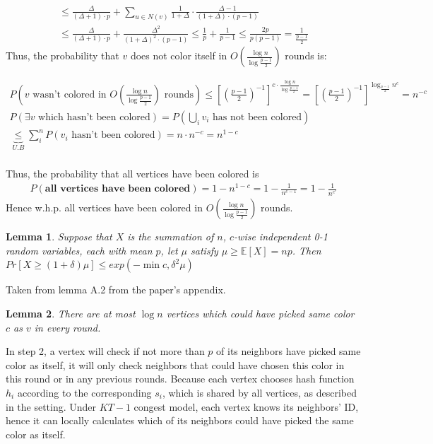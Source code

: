 \documentclass[11pt]{article}
\newtheorem{lemma}{Lemma}
\begin{document}
\begin{gather*}
\le \frac{\Delta}{(\Delta + 1) \cdot p} + \sum_{u \in N(v)}{\frac{1}{1 + \Delta} \cdot \frac{\Delta-1}{(1+ \Delta) \cdot (p-1)} } \\
\le \frac{\Delta}{(\Delta + 1) \cdot p} + \frac{\Delta^2}{(1 + \Delta)^2 \cdot (p-1)}
\le \frac{1}{p} + \frac{1}{p-1} \le \frac{2p}{p(p-1)} = \frac{1}{\frac{p-1}{2}}
\end{gather*}
Thus, the probability that $v$ does not color itself in $O(\frac{\log{n}}{\log{\frac{p-1}{2}}})$ rounds is:

\begin{gather*}
P(v \text{ wasn't colored in $O(\frac{\log{n}}{\log{\frac{p-1}{2}}})$ rounds})
\le [(\frac{p-1}{2})^{-1}]^{c \cdot \frac{\log{n}}{\log{\frac{p-1}{2}}}}
= [(\frac{p-1}{2})^{-1}]^{\log_{\frac{p-1}{2}}{n^c}}= n^{-c} \\
P(\exists v \text{ which hasn't been colored}) = P(\bigcup_{i} v_i \text{ has not been colored}) \\
\underset{U.B}{\underbrace{\le}} \sum_{i}^{n} P(v_i \text{ hasn't been colored}) = n \cdot n^{-c} = n^{1-c} \\
\end{gather*}

Thus, the probability that all vertices have been colored is
\begin{gather*}
P(\textbf{all vertices have been colored}) = 1 - n^{1-c} = 1 - \frac{1}{n^{c-1}} = 1 - \frac{1}{n^{c'}}
\end{gather*}
Hence w.h.p. all vertices have been colored in  $O(\frac{\log{n}}{\log{\frac{p-1}{2}}})$ rounds. 

\begin{lemma}
\label{A_2_APPENDIX}
Suppose that $X$ is the summation of $n$, $c$-wise independent 0-1 random variables, each with mean $p$, let $\mu$ satisfy $\mu \ge \mathbb{E}[X] = np$. Then $Pr[X \ge (1+\delta)\mu] \le exp(-\min{c, \delta^2 \mu})$
\end{lemma}
Taken from lemma A.2 from the paper's appendix.

\begin{lemma}
\label{colors_conflict}
There are at most $\log{n}$ vertices which could have picked same color $c$ as $v$ in every round.
\end{lemma}
In step 2, a vertex will check if not more than $p$ of its neighbors have picked same color as itself, it will only check neighbors that could have chosen this color in this round or in any previous rounds. Because each vertex chooses hash function $h_i$ according to the corresponding $s_i$, which is shared by all vertices, as described in the setting. Under $KT-1$ congest model, each vertex knows its neighbors' ID, hence it can locally calculates which of its neighbors could have picked the same color as itself.
\end{document}
